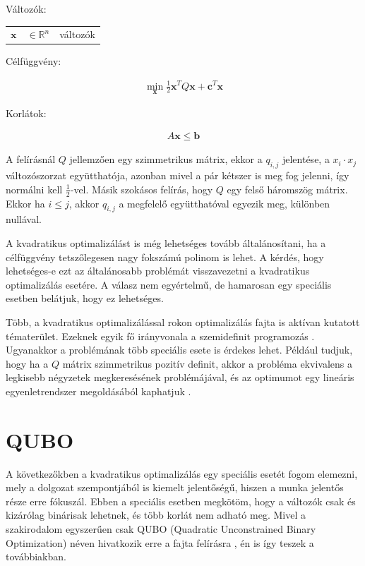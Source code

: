 Változók:

\begin{tabular}{lll}
	$\mathbf{x}$ & $\in \mathbb{R}^n$ & változók \\
\end{tabular}

Célfüggvény:

\begin{align}
	\min_{\mathbf{x}} \frac{1}{2} \mathbf{x}^T Q \mathbf{x} + \mathbf{c}^T \mathbf{x} 
\end{align}

Korlátok:

\begin{align}
	A\mathbf{x} \leq \mathbf{b}
\end{align}

A felírásnál $Q$ jellemzően egy szimmetrikus mátrix, ekkor a $q_{i,j}$ jelentése, a $x_i \cdot x_j$ változószorzat együtthatója, azonban mivel a pár kétszer is meg fog jelenni, így normálni kell $\frac{1}{2}$-vel. Másik szokásos felírás, hogy $Q$ egy felső háromszög mátrix. Ekkor ha $i \leq j$, akkor $q_{i,j}$ a megfelelő együtthatóval egyezik meg, különben nullával.

A kvadratikus optimalizálást is még lehetséges tovább általánosítani, ha a célfüggvény tetszőlegesen nagy fokszámú polinom is lehet. A kérdés, hogy lehetséges-e ezt az általánosabb problémát visszavezetni a kvadratikus optimalizálás esetére. A válasz nem egyértelmű, de hamarosan egy speciális esetben belátjuk, hogy ez lehetséges.

Több, a kvadratikus optimalizálással rokon optimalizálás fajta is aktívan kutatott tématerület. Ezeknek egyik fő irányvonala a szemidefinit programozás \cite{Ramana1996}. Ugyanakkor a problémának több speciális esete is érdekes lehet. Például tudjuk, hogy ha a $Q$ mátrix szimmetrikus pozitív definit, akkor a probléma ekvivalens a legkisebb négyzetek megkeresésének problémájával, és az optimumot egy lineáris egyenletrendszer megoldásából kaphatjuk \cite{rozsa}.

\section{QUBO}\label{sec:QUBO}

A következőkben a kvadratikus optimalizálás egy speciális esetét fogom elemezni, mely a dolgozat szempontjából is kiemelt jelentőségű, hiszen a munka jelentős része erre fókuszál. Ebben a speciális esetben megkötöm, hogy a változók csak és kizárólag binárisak lehetnek, és több korlát nem adható meg. Mivel a szakirodalom egyszerűen csak QUBO (Quadratic Unconstrained Binary Optimization) néven hivatkozik erre a fajta felírásra \cite{enwiki:1020700695, DWaveOceanBQM}, én is így teszek a továbbiakban.

